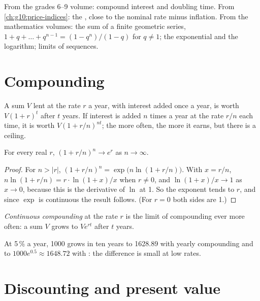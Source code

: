 \begin{recall}
From the grades 6--9 volume: compound interest and doubling time. From \cref{ch:g10:price-indices}: the , close to the nominal rate minus inflation. From
the mathematics volumes: the sum of a finite geometric series, $1 + q + \dots + q^{n-1} = (1 - q^n)/(1 - q)$ for $q \ne 1$; the exponential and the logarithm; limits of
sequences.
\end{recall}

\section{Compounding}\label{sec:g12:present-value:compounding}

A sum $V$ lent at the rate $r$ a year, with interest added once a year, is worth $V(1 + r)^t$ after $t$ years. If interest is added $n$ times a year at the rate $r/n$
each time, it is worth $V(1 + r/n)^{nt}$; the more often, the more it earns, but there is a ceiling.

\begin{proposition}\label{prop:g12:present-value:limit}
For every real $r$, $(1 + r/n)^n \to e^r$ as $n \to \infty$.
\end{proposition}
\begin{proof}
For $n > |r|$, $(1 + r/n)^n = \exp\bigl(n \ln(1 + r/n)\bigr)$. With $x = r/n$, $n \ln(1 + r/n) = r \cdot \ln(1 + x)/x$ when $r \ne 0$, and $\ln(1 + x)/x \to 1$ as
$x \to 0$, because this is the derivative of $\ln$ at 1. So the exponent tends to $r$, and since $\exp$ is continuous the result follows. (For $r = 0$ both sides are 1.)
\end{proof}

\begin{definition}\label{def:g12:present-value:continuous-compounding}
\emph{Continuous compounding} at the rate $r$ is the limit of compounding ever more often: a sum $V$ grows to $Ve^{rt}$ after $t$ years.
\end{definition}

At 5\,\% a year, 1000 grows in ten years to 1628.89 with yearly compounding and to $1000e^{0.5} \approx 1648.72$ with : the difference is small at low
rates.

\section{Discounting and present value}\label{sec:g12:present-value:discounting}

